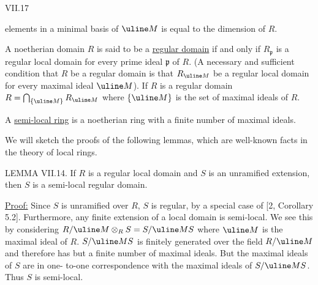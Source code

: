 VII.17

elements in a minimal basis of $\uline M$ is equal to the dimension of $R$.

A noetherian domain $R$ is said to be a \uline{regular domain} if and
only if $R_{\mathfrak p}$ is a regular local domain for every prime ideal $\mathfrak p$ of $R$.
(A necessary and sufficient condition that $R$ be a regular domain is
that $R_{\uline M}$ be a regular local domain for every maximal ideal $\uline M$). If
$R$ is a regular domain $R=\bigcap_{\{\uline M\}}R_{\uline M}$ where $\{\uline M\}$ is the set of
maximal ideals of $R$.

A \uline{semi-local ring} is a noetherian ring with a finite number of
maximal ideals.

We will sketch the proofs of the following lemmas, which are
well-known facts in the theory of local rings.

LEMMA VII.14. If $R$ is a regular local domain and $S$ is an
unramified extension, then $S$ is a semi-local regular domain.

\uline{Proof:} Since $S$ is unramified over $R$, $S$ is regular, by a
special case of [2, Corollary 5.2]. Furthermore, any finite
extension of a local domain is semi-local. We see this by considering
$R/\uline M\otimes_R S=S/\uline M S$ where $\uline M$ is the maximal ideal of $R$. $S/\uline M S$ is
finitely generated over the field $R/\uline M$ and therefore has but a finite
number of maximal ideals. But the maximal ideals of $S$ are in one-
to-one correspondence with the maximal ideals of $S/\uline M S$. Thus $S$
is semi-local.
